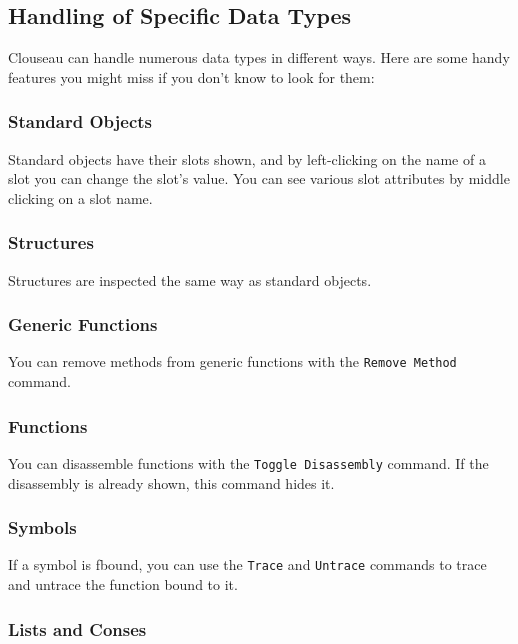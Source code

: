 \subsection{Handling of Specific Data Types}

Clouseau can handle numerous data types in different ways. Here are some
handy features you might miss if you don't know to look for them:

\subsubsection{Standard Objects}

Standard objects have their slots shown, and by left-clicking on the
name of a slot you can change the slot's value. You can see various slot
attributes by middle clicking on a slot name.

\subsubsection{Structures}

Structures are inspected the same way as standard objects.

\subsubsection{Generic Functions}

You can remove methods from generic functions with the \texttt{Remove Method}
command.

\subsubsection{Functions}

You can disassemble functions with the \texttt{Toggle Disassembly}
command. If the disassembly is already shown, this command hides it.

\subsubsection{Symbols}

If a symbol is fbound, you can use the \texttt{Trace} and \texttt{Untrace}
commands to trace and untrace the function bound to it.

\subsubsection{Lists and Conses}

